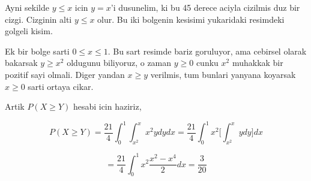 \documentclass[12pt,fleqn]{article}\usepackage{../common}
\begin{document}
Ayni sekilde $y \le x$ icin $y = x$'i dusunelim, ki bu 45 derece aciyla
cizilmis duz bir cizgi. Cizginin alti $y \le x$ olur. Bu iki bolgenin
kesisimi yukaridaki resimdeki golgeli kisim. 

Ek bir bolge sarti $0 \le x \le 1$. Bu sart resimde bariz goruluyor, ama
cebirsel olarak bakarsak $y \ge x^2$ oldugunu biliyoruz, o zaman $y \ge 0$
cunku $x^2$ muhakkak bir pozitif sayi olmali. Diger yandan $x \ge y$
verilmis, tum bunlari yanyana koyarsak $x \ge 0$ sarti ortaya cikar. 

Artik $P(X \ge Y)$ hesabi icin haziriz, 

\[ P(X \ge Y) = 
\frac{ 21}{4} \int_{ 0}^{1} \int _{ x^2}^{x} x^2y dy dx = 
\frac{ 21}{4} \int_{ 0}^{1} x^2 \bigg[ \int _{ x^2}^{x} y dy \bigg] dx 
 \]

\[ = \frac{ 21}{4} \int _{ 0}^{1} x^2 \frac{ x^2 - x^4}{2} dx = \frac{ 3}{20} \]
\end{document}
